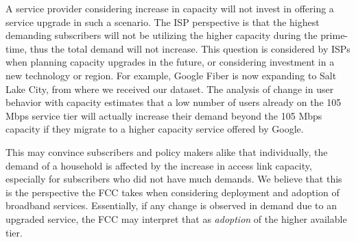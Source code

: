 A service provider considering increase in 
capacity will not invest in offering a service upgrade in such a scenario. The 
ISP perspective is that the highest demanding subscribers will not be utilizing 
the higher capacity during the prime-time, thus the total demand will not 
increase. This question is considered by ISPs when planning capacity upgrades 
in the future, or considering investment in a new technology or region. For 
example, Google Fiber is now expanding to Salt Lake City, from where 
we received our dataset. The analysis of change in user behavior with capacity 
estimates that a low number of users already on the 105 Mbps service tier will 
actually increase their demand beyond the 105 Mbps capacity if they 
migrate to a higher capacity service offered by Google. 

This may 
convince subscribers and policy makers alike that individually, the demand of a 
household is affected by the increase in access link capacity, especially for 
subscribers who did not have much demands. We believe that this is the 
perspective the FCC takes when considering deployment and adoption of 
broadband services. Essentially, if any change is observed in demand due to an 
upgraded service, the FCC may interpret that as \emph{adoption} of the higher 
available tier.
